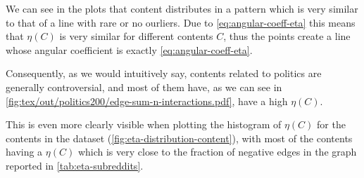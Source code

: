 We can see in the plots that content distributes in a pattern which is very
similar to that of a line with rare or no ourliers. Due to
\eqref{eq:angular-coeff-eta} this means that $\eta(C)$ is very similar for
different contents $C$, thus the points create a line whose angular coefficient
is exactly \eqref{eq:angular-coeff-eta}.

Consequently, as we would intuitively say, contents related
to politics are generally controversial, and most of them have, as we can see
in \autoref{fig:tex/out/politics200/edge-sum-n-interactions.pdf}, have a high
$\eta(C)$.

This is even more clearly visible when plotting the histogram of $\eta(C)$ for the contents in the dataset
(\autoref{fig:eta-distribution-content}), with most of the contents having a
$\eta(C)$ which is very close to the fraction of negative edges in the graph
reported in \autoref{tab:eta-subreddits}.


